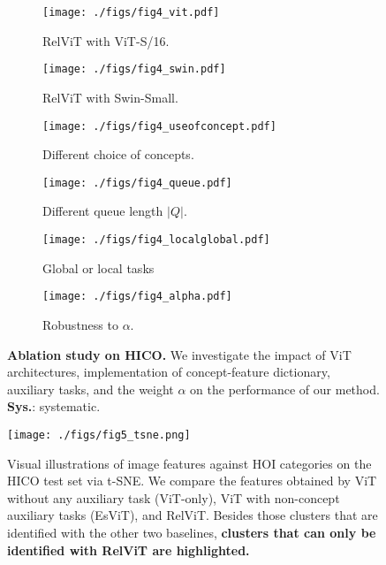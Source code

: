 \documentclass{article} \usepackage{iclr2022_conference,times}
\begin{document}
\begin{figure}[t!]
     \centering
     \begin{subfigure}[b]{0.32\textwidth}
         \centering
         \texttt{[image: ./figs/fig4\_vit.pdf]}
         \vskip-0.08in
         \caption{RelViT with ViT-S/16.}
         \label{fig:a}
     \end{subfigure}
     \hfill
     \begin{subfigure}[b]{0.32\textwidth}
         \centering
         \texttt{[image: ./figs/fig4\_swin.pdf]}
         \vskip-0.08in
         \caption{RelViT with Swin-Small.}
         \label{fig:b}
     \end{subfigure}
     \hfill
     \begin{subfigure}[b]{0.32\textwidth}
         \centering
         \texttt{[image: ./figs/fig4\_useofconcept.pdf]}
         \vskip-0.08in
         \caption{Different choice of concepts.}
         \label{fig:c}
     \end{subfigure}
     \vfill
         \begin{subfigure}[b]{0.32\textwidth}
         \centering
         \texttt{[image: ./figs/fig4\_queue.pdf]}
         \vskip-0.08in
         \caption{Different queue length $|Q|$.}
         \label{fig:d}
     \end{subfigure}
     \hfill
     \begin{subfigure}[b]{0.32\textwidth}
         \centering
         \texttt{[image: ./figs/fig4\_localglobal.pdf]}
         \vskip-0.08in
         \caption{Global or local tasks}
         \label{fig:e}
     \end{subfigure}
     \hfill
     \begin{subfigure}[b]{0.32\textwidth}
         \centering
         \texttt{[image: ./figs/fig4\_alpha.pdf]}
         \vskip-0.13in
         \caption{Robustness to $\alpha$.}
         \label{fig:f}
     \end{subfigure}
    \vskip-0.1in
     \caption{\textbf{Ablation study on HICO.} We investigate the impact of ViT architectures, implementation of concept-feature dictionary, auxiliary tasks, and the weight $\alpha$ on the performance of our method. \textbf{Sys.}: systematic.}
     \label{fig:ablation}
\end{figure}


\begin{figure}[t]
    \vskip -0.15in
    \centering
    \texttt{[image: ./figs/fig5\_tsne.png]}
    \vskip-0.2in
    \caption{Visual illustrations of image features against HOI categories on the HICO test set via t-SNE. We compare the features obtained by ViT without any auxiliary task (ViT-only), ViT with non-concept auxiliary tasks (EsViT), and RelViT. Besides those clusters that are identified with the other two baselines, \textbf{clusters that can only be identified with RelViT are highlighted.}}
    \label{fig:tsne}
        \vskip-0.15in
\end{figure}
\end{document}
